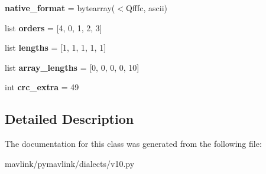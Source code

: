 \begin{DoxyCompactItemize}
{\bfseries native\+\_\+format} = bytearray(\textquotesingle{}$<$Qfffc\textquotesingle{}, \textquotesingle{}ascii\textquotesingle{})
\item 
\mbox{\label{classpymavlink_1_1dialects_1_1v10_1_1MAVLink__debug__vect__message_a548f9ea7ac4e457fe00ecda99f81657b}} 
list {\bfseries orders} = \mbox{[}4, 0, 1, 2, 3\mbox{]}
\item 
\mbox{\label{classpymavlink_1_1dialects_1_1v10_1_1MAVLink__debug__vect__message_a70f8bfd720e6cb90b14ff649074271f9}} 
list {\bfseries lengths} = \mbox{[}1, 1, 1, 1, 1\mbox{]}
\item 
\mbox{\label{classpymavlink_1_1dialects_1_1v10_1_1MAVLink__debug__vect__message_a9c1e386d3b417be9424652c08cf8bee3}} 
list {\bfseries array\+\_\+lengths} = \mbox{[}0, 0, 0, 0, 10\mbox{]}
\item 
\mbox{\label{classpymavlink_1_1dialects_1_1v10_1_1MAVLink__debug__vect__message_ad0eb4ee0bdc1d02c0fae57fdfb7246ac}} 
int {\bfseries crc\+\_\+extra} = 49
\end{DoxyCompactItemize}


\subsection{Detailed Description}
\begin{DoxyVerb}\end{DoxyVerb}
 

The documentation for this class was generated from the following file\+:\begin{DoxyCompactItemize}
\item 
mavlink/pymavlink/dialects/v10.\+py\end{DoxyCompactItemize}

